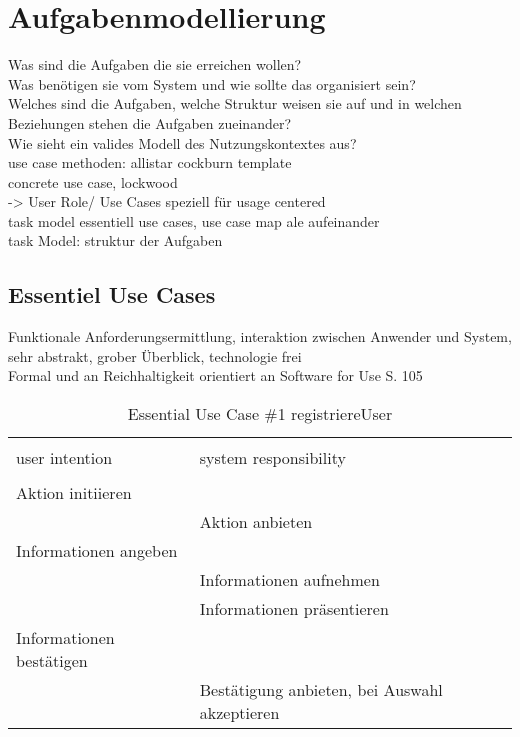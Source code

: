 
\section{Aufgabenmodellierung}

Was sind die Aufgaben die sie erreichen wollen?\\
Was benötigen sie vom System und wie sollte das organisiert sein?\\
Welches sind die Aufgaben, welche Struktur weisen sie auf und in welchen Beziehungen stehen die Aufgaben zueinander?\\
Wie sieht ein valides Modell des Nutzungskontextes aus?\\

use case methoden: allistar cockburn template \\
concrete use case, lockwood\\


-> User Role/ Use Cases speziell für usage centered	\\
task model essentiell use cases, use case map ale aufeinander\\

task Model: struktur der Aufgaben\\


\subsection{Essentiel Use Cases}
Funktionale Anforderungsermittlung, interaktion zwischen Anwender und System, sehr abstrakt, grober Überblick, technologie frei\\
Formal und an Reichhaltigkeit orientiert an Software for Use S. 105

\begin{table}[H]
\caption{Essential Use Case \#1 registriereUser }
\centering
\begin{tabular}{l l}
\\ [-0.5ex]

\hline\hline
\\ [-0.5ex]
user intention & system responsibility
\\ [1.5ex]
\hline
\\ [-0.5ex]
Aktion initiieren			& 											\\[1ex]
							& Aktion anbieten							\\[1ex]
Informationen angeben 		& 											\\[1ex] 
							& Informationen aufnehmen					\\[1ex]
							& Informationen präsentieren				\\[1ex]
Informationen bestätigen	& 											\\[1ex]
							& Bestätigung anbieten, bei Auswahl akzeptieren  \\[1ex]


\hline
\end{tabular}
\label{tab:anmelden}
\end{table}

